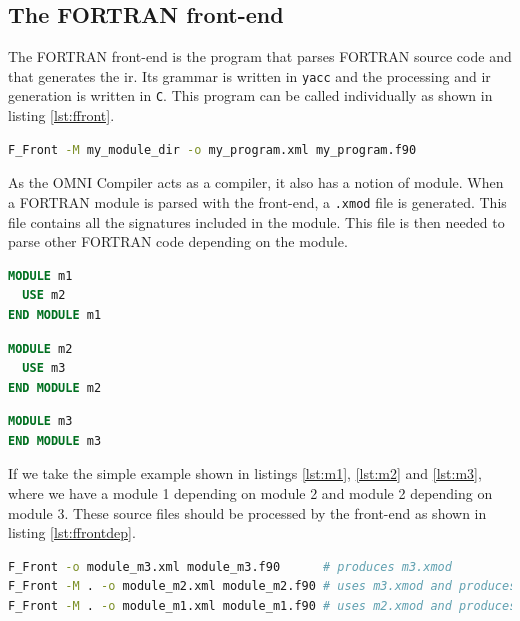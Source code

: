 \documentclass[a4paper, 11pt]{report}
\def\omni{OMNI Compiler\xspace}
\begin{document}
\subsection{The FORTRAN front-end}
The FORTRAN front-end is the program that parses FORTRAN source code and that 
generates the \gls{ir}. Its grammar is written in \lstinline|yacc| and the 
processing and \gls{ir} generation is written in \lstinline|C|. This program 
can be called individually as shown in listing \ref{lst:ffront}.

\begin{lstlisting}[label=lst:ffront, language=Bash, caption=Call F\_Front]
F_Front -M my_module_dir -o my_program.xml my_program.f90
\end{lstlisting}

As the \omni acts as a compiler, it also has a notion of module. When a FORTRAN
module is parsed with the front-end, a \lstinline|.xmod| file is generated. 
This file contains all the signatures included in the module. This file is then 
needed to parse other FORTRAN code depending on the module.

\begin{lstlisting}[label=lst:m1, language=Fortran, caption=module\_m1.f90]
MODULE m1
  USE m2
END MODULE m1
\end{lstlisting}

\begin{lstlisting}[label=lst:m2, language=Fortran, caption=module\_m2.f90]
MODULE m2
  USE m3
END MODULE m2
\end{lstlisting}

\begin{lstlisting}[label=lst:m3, language=Fortran, caption=module\_m3.f90]
MODULE m3
END MODULE m3
\end{lstlisting}

If we take the simple example shown in listings \ref{lst:m1}, \ref{lst:m2} and 
\ref{lst:m3}, where we have a module 1 depending on module 2 and module 2 
depending on module 3. These source files should be processed by the front-end
as shown in listing \ref{lst:ffrontdep}.

\begin{lstlisting}[label=lst:ffrontdep, language=Bash, caption=Parse module with dependencies]
F_Front -o module_m3.xml module_m3.f90      # produces m3.xmod
F_Front -M . -o module_m2.xml module_m2.f90 # uses m3.xmod and produces m2.xmod
F_Front -M . -o module_m1.xml module_m1.f90 # uses m2.xmod and produces m1.xmod
\end{lstlisting}
\end{document}
